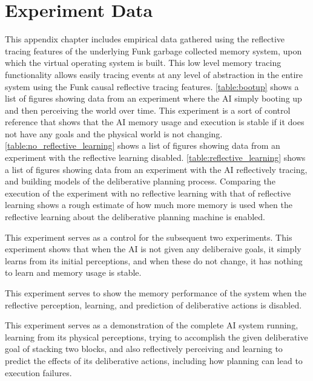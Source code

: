 \chapter{Experiment Data}
\label{chapter:experiment_data}

This appendix chapter includes empirical data gathered using the
reflective tracing features of the underlying Funk garbage collected
memory system, upon which the virtual operating system is built.  This
low level memory tracing functionality allows easily tracing events at
any level of abstraction in the entire system using the Funk causal
reflective tracing features.  \autoref{table:bootup} shows a list of
figures showing data from an experiment where the AI simply booting up
and then perceiving the world over time.  This experiment is a sort of
control reference that shows that the AI memory usage and execution is
stable if it does not have any goals and the physical world is not
changing.  \autoref{table:no_reflective_learning} shows a list of
figures showing data from an experiment with the reflective learning
disabled.  \autoref{table:reflective_learning} shows a list of figures
showing data from an experiment with the AI reflectively tracing, and
building models of the deliberative planning process.  Comparing the
execution of the experiment with no reflective learning with that of
reflective learning shows a rough estimate of how much more memory is
used when the reflective learning about the deliberative planning
machine is enabled.

 {This experiment serves as a
  control for the subsequent two experiments.  This experiment shows
  that when the AI is not given any deliberaive goals, it simply
  learns from its initial perceptions, and when these do not change,
  it has nothing to learn and memory usage is stable.}

 {This experiment serves to show the memory
  performance of the system when the reflective perception, learning,
  and prediction of deliberative actions is disabled.}

 {This experiment serves as a demonstration of the
  complete AI system running, learning from its physical perceptions,
  trying to accomplish the given deliberative goal of stacking two
  blocks, and also reflectively perceiving and learning to predict the
  effects of its deliberative actions, including how planning can lead
  to execution failures.}


